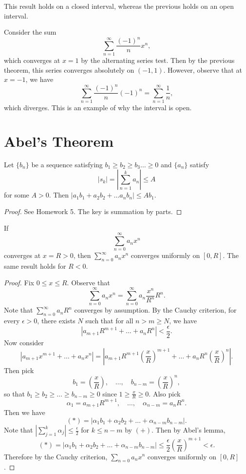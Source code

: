 \begin{remark}
  This result holds on a closed interval,
  whereas the previous holds on an open interval.
\end{remark}

\begin{example}
  Consider the sum
  \[\sum_{n = 1}^\infty \frac{(-1)^n}{n} x^n,\]
  which converges at $x = 1$ by the alternating series test.
  Then by the previous theorem, this series converges
  absolutely on $(-1, 1)$. However, observe that at $x = -1$,
  we have
  \[\sum_{n = 1}^\infty \frac{(-1)^n}{n} (-1)^n = \sum_{n = 1}^\infty \frac{1}{n},\]
  which diverges. This is an example of why the
  interval is open.
\end{example}

\section{Abel's Theorem}
\begin{lemma}
  Let $\{b_n\}$ be a sequence satisfying
  $b_1 \ge b_2 \ge b_3 \dots \ge 0$ and $\{a_n\}$ satisfy
  \[|s_k| = \left|\sum_{n = 1}^k a_n\right| \le A\]
  for some $A > 0$. Then
  $|a_1b_1 + a_2b_2 + \dots a_nb_n| \le Ab_1$.
\end{lemma}

\begin{proof}
  See Homework 5. The key is summation by parts.
\end{proof}

\begin{theorem}
  If
  \[\sum_{n = 0}^\infty a_nx^n\]
  converges at $x = R > 0$, then $\sum_{n = 0}^\infty a_nx^n$
  converges uniformly on $[0, R]$. The same result holds for
  $R < 0$.
\end{theorem}

\begin{proof}
  Fix $0 \le x \le R$. Observe that
  \[
    \sum_{n = 0}^\infty a_n x^n =
    \sum_{n = 0}^\infty a_n \frac{x^n}{R^n} R^n.
  \]
  Note that $\sum_{n = 0}^\infty a_n R^n$
  converges by assumption. By the Cauchy criterion, for
  every $\epsilon > 0$, there exists $N$ such that
  for all $n > m \ge N$, we have
  \[|a_{m + 1}R^{m + 1} + \dots + a_nR^n| < \frac{\epsilon}{2}. \tag{$+$}\]
  Now consider
  \[
    |a_{m + 1}x^{m + 1} + \dots + a_nx^n|
    = \left|a_{m + 1} R^{m + 1} \left(\frac{x}{R}\right)^{m + 1}
    + \dots + a_n R^n \left(\frac{x}{R}\right)^n\right|.
    \tag{$*$}
  \]
  Then pick
  \[b_1 = \left(\frac{x}{R}\right), \quad \dots, \quad b_{n - m} = \left(\frac{x}{R}\right)^n,\]
  so that $b_1 \ge b_2 \ge \dots \ge b_{n - m} \ge 0$
  since $1 \ge \frac{x}{R} \ge 0$. Also pick
  \[\alpha_1 = a_{m + 1} R^{m + 1}, \quad \dots, \quad \alpha_{n - m} = a_nR^n.\]
  Then we have 
  \[(*) = |\alpha_1 b_1 + \alpha_2 b_2 + \dots + \alpha_{n - m}b_{n - m}|.\]
  Note that $\left|\sum_{j = 1}^k \alpha_j\right| \le \frac{\epsilon}{2}$
  for $k \le n - m$ by $(+)$. Then by Abel's lemma,
  \[(*) = |\alpha_1 b_1 + \alpha_2 b_2 + \dots + \alpha_{n - m}b_{n - m}| \le \frac{\epsilon}{2} \left(\frac{x}{R}\right)^{m + 1} < \epsilon.\]
  Therefore by the Cauchy criterion,
  $\sum_{n = 0} a_n x^n$ converges uniformly on $[0, R]$.
\end{proof}

